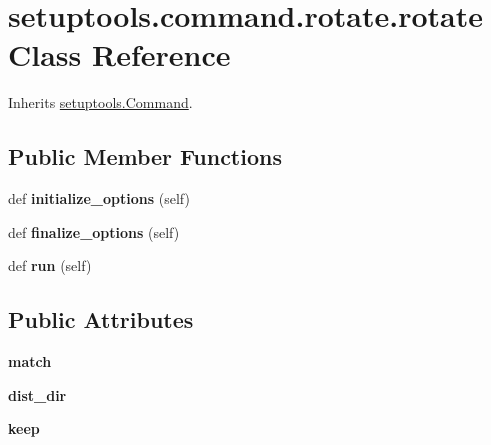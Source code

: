\hypertarget{classsetuptools_1_1command_1_1rotate_1_1rotate}{}\section{setuptools.\+command.\+rotate.\+rotate Class Reference}
\label{classsetuptools_1_1command_1_1rotate_1_1rotate}


Inherits \hyperlink{classsetuptools_1_1_command}{setuptools.\+Command}.

\subsection*{Public Member Functions}
\begin{DoxyCompactItemize}
\item 
\mbox{\label{classsetuptools_1_1command_1_1rotate_1_1rotate_a5ec8c4fb43507418406dabbc1ccba524}} 
def {\bfseries initialize\+\_\+options} (self)
\item 
\mbox{\label{classsetuptools_1_1command_1_1rotate_1_1rotate_a79937f11c485822401654095958261ab}} 
def {\bfseries finalize\+\_\+options} (self)
\item 
\mbox{\label{classsetuptools_1_1command_1_1rotate_1_1rotate_ab616d54a363a536c0201b55dcc2b1110}} 
def {\bfseries run} (self)
\end{DoxyCompactItemize}
\subsection*{Public Attributes}
\begin{DoxyCompactItemize}
\item 
\mbox{\label{classsetuptools_1_1command_1_1rotate_1_1rotate_aad28873ea7841e9e3a363080894c3c31}} 
{\bfseries match}
\item 
\mbox{\label{classsetuptools_1_1command_1_1rotate_1_1rotate_aca12ffc1c06ceed3253ca385f11d5e40}} 
{\bfseries dist\+\_\+dir}
\item 
\mbox{\label{classsetuptools_1_1command_1_1rotate_1_1rotate_a5d5aeaa431c28bf2504ae02606f40342}} 
{\bfseries keep}
\end{DoxyCompactItemize}
